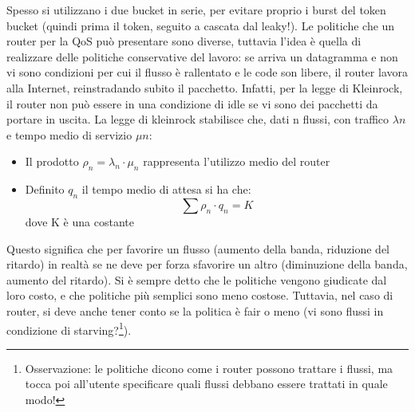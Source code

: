 Spesso si utilizzano i due bucket in serie, per evitare proprio i burst del token bucket (quindi prima il token,
seguito a cascata dal leaky!).
Le politiche che un router per la QoS può presentare sono diverse, tuttavia l'idea è quella di realizzare delle
politiche conservative del lavoro: se arriva un datagramma e non vi sono condizioni per cui il flusso è rallentato
e le code son libere, il router lavora alla Internet, reinstradando subito il pacchetto. Infatti, per la legge di
Kleinrock, il router non può essere in una condizione di idle se vi sono dei pacchetti da portare in uscita. La legge
di kleinrock stabilisce che, dati n flussi, con traffico $\lambda n$ e tempo medio di servizio $\mu n$:
\begin{itemize}
 \item Il prodotto $\rho_n = \lambda_n \cdot \mu_n$ rappresenta l'utilizzo medio del router
 \item Definito $q_n$ il tempo medio di attesa si ha che:
 \begin{equation}
  \sum \rho_n \cdot q_n = K
 \end{equation}
 dove K è una costante
\end{itemize}
Questo significa che per favorire un flusso (aumento della banda, riduzione del ritardo) in realtà se ne deve per
forza sfavorire un altro (diminuzione della banda, aumento del ritardo).
Si è sempre detto che le politiche vengono giudicate dal loro costo, e che politiche più semplici sono meno costose.
Tuttavia, nel caso di router, si deve anche tener conto se la politica è fair o meno (vi sono flussi in condizione di
starving?\footnote{Osservazione: le politiche dicono come i router possono trattare i flussi, ma tocca poi all’utente
specificare quali flussi debbano essere trattati in quale modo!}).

